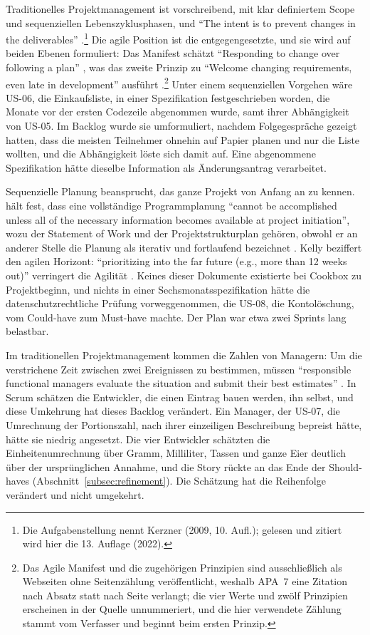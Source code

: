 Traditionelles Projektmanagement ist vorschreibend, mit klar definiertem Scope und
sequenziellen Lebenszyklusphasen, und \enquote{The intent is to prevent changes in
the deliverables} \parencite[p.~308]{kerzner2022}.\footnote{Die Aufgabenstellung
nennt Kerzner (2009, 10. Aufl.); gelesen und zitiert wird hier die 13. Auflage
(2022).}
Die agile Position ist die entgegengesetzte, und sie wird auf beiden Ebenen
formuliert: Das Manifest
schätzt \enquote{Responding to change over following a plan}
\parencite[para.~2]{beck2001manifesto}, was das zweite Prinzip zu
\enquote{Welcome changing requirements, even late in development} ausführt
\parencite[para.~2]{beck2001principles}.\footnote{Das Agile Manifest und die
zugehörigen Prinzipien sind ausschließlich als Webseiten ohne Seitenzählung
veröffentlicht, weshalb APA~7 eine Zitation nach Absatz statt nach Seite
verlangt; die vier Werte und zwölf Prinzipien erscheinen in der Quelle
unnummeriert, und die hier verwendete Zählung stammt vom Verfasser und beginnt
beim ersten Prinzip.} Unter einem sequenziellen Vorgehen wäre US-06, die
Einkaufsliste, in einer Spezifikation festgeschrieben worden, die Monate vor der
ersten Codezeile abgenommen wurde, samt ihrer Abhängigkeit von US-05. Im Backlog
wurde sie umformuliert, nachdem Folgegespräche gezeigt hatten, dass die meisten
Teilnehmer ohnehin auf Papier planen und nur die Liste wollten, und die
Abhängigkeit löste sich damit auf. Eine abgenommene Spezifikation hätte dieselbe
Information als Änderungsantrag verarbeitet.

Sequenzielle Planung beansprucht, das ganze Projekt von Anfang an zu kennen.
\textcite[p.~378]{kerzner2022} hält fest, dass eine vollständige Programmplanung
\enquote{cannot be accomplished unless all of the necessary information becomes
available at project initiation}, wozu der Statement of Work und der
Projektstrukturplan gehören, obwohl er an anderer Stelle die Planung als iterativ
und fortlaufend bezeichnet
\parencite[p.~367]{kerzner2022}. Kelly beziffert den agilen Horizont:
\enquote{prioritizing into the far future (e.g., more than 12 weeks out)}
verringert die Agilität \parencite[ch.~8, pp.~57--62]{kelly2019}. Keines dieser
Dokumente existierte bei Cookbox zu Projektbeginn, und nichts in einer
Sechsmonatsspezifikation hätte die datenschutzrechtliche Prüfung vorweggenommen,
die US-08, die Kontolöschung, vom Could-have zum Must-have machte. Der Plan war
etwa zwei Sprints lang belastbar.

Im traditionellen Projektmanagement kommen die Zahlen von Managern: Um die
verstrichene Zeit zwischen zwei Ereignissen zu bestimmen, müssen
\enquote{responsible functional managers evaluate the situation and submit their
best estimates} \parencite[p.~455]{kerzner2022}. In Scrum schätzen die Entwickler, die einen
Eintrag bauen werden, ihn selbst, und diese Umkehrung hat dieses Backlog
verändert. Ein Manager, der US-07, die Umrechnung der Portionszahl, nach ihrer
einzeiligen Beschreibung bepreist hätte, hätte sie niedrig angesetzt. Die vier
Entwickler schätzten die Einheitenumrechnung über Gramm, Milliliter, Tassen und
ganze Eier deutlich über der ursprünglichen Annahme, und die Story rückte an das
Ende der Should-haves (Abschnitt~\ref{subsec:refinement}). Die Schätzung hat die
Reihenfolge verändert und nicht umgekehrt.

